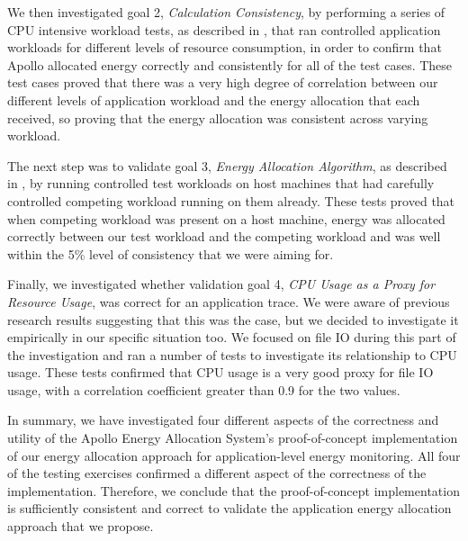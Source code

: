 We then investigated goal 2, \textit{Calculation Consistency}, by performing a series of CPU intensive workload tests, as described in , that ran controlled application workloads for different levels of resource consumption, in order to confirm that Apollo allocated energy correctly and consistently for all of the test cases.  These test cases proved that there was a very high degree of correlation between our different levels of application workload and the energy allocation that each received, so proving that the energy allocation was consistent across varying workload.

The next step was to validate goal 3, \textit{Energy Allocation Algorithm}, as described in , by running controlled test workloads on host machines that had carefully controlled competing workload running on them already. These tests proved that when competing workload was present on a host machine, energy was allocated correctly between our test workload and the competing workload and was well within the 5\% level of consistency that we were aiming for.

Finally, we investigated whether validation goal 4, \textit{CPU Usage as a Proxy for Resource Usage}, was correct for an application trace.  We were aware of previous research results suggesting that this was the case, but we decided to investigate it empirically in our specific situation too.  We focused on file IO during this part of the investigation and ran a number of tests to investigate its relationship to CPU usage.  These tests confirmed that CPU usage is a very good proxy for file IO usage, with a correlation coefficient greater than 0.9 for the two values.

In summary, we have investigated four different aspects of the correctness and utility of the Apollo Energy Allocation System's proof-of-concept implementation of our energy allocation approach for application-level energy monitoring.  All four of the testing exercises confirmed a different aspect of the correctness of the implementation.  Therefore, we conclude that the proof-of-concept implementation is sufficiently consistent and correct to validate the application energy allocation approach that we propose.


